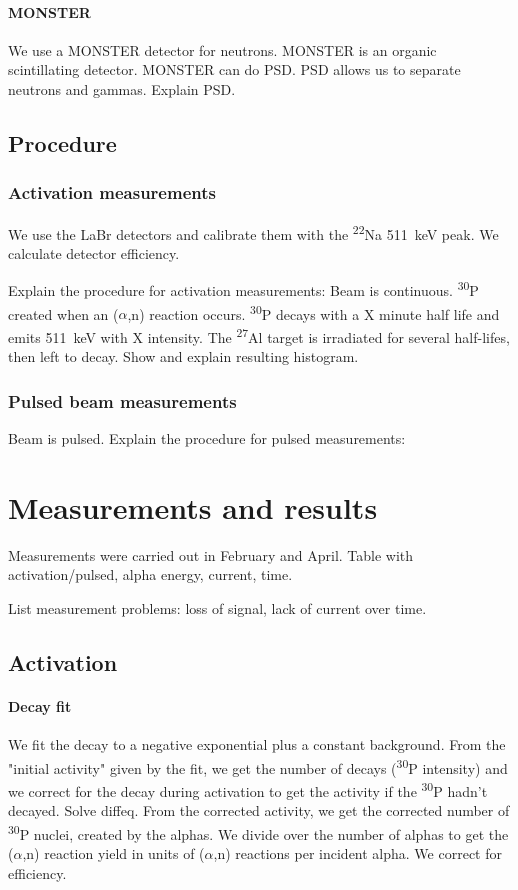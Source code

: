 \documentclass[a4paper,12pt]{report}
\newcommand{\an}{($\alpha$,n) }
\newcommand{\Aliso}{\textsuperscript{27}Al }
\newcommand{\Piso}{\textsuperscript{30}P }
\newcommand{\Na}{\textsuperscript{22}Na }
\begin{document}
\subsubsection{MONSTER}
We use a MONSTER detector for neutrons.
MONSTER is an organic scintillating detector.
MONSTER can do PSD.
PSD allows us to separate neutrons and gammas.
Explain PSD.

\section{Procedure}
\subsection{Activation measurements}
We use the LaBr detectors and calibrate them with the \Na \qty{511}{\keV} peak.
We calculate detector efficiency.

Explain the procedure for activation measurements:
Beam is continuous.
\Piso created when an \an reaction occurs.
\Piso decays with a X minute half life and emits \qty{511}{\keV} with X intensity.
The \Aliso target is irradiated for several half-lifes, then left to decay.
Show and explain resulting histogram.

\subsection{Pulsed beam measurements}
Beam is pulsed.
Explain the procedure for pulsed measurements:


\chapter{Measurements and results}
Measurements were carried out in February and April.
Table with activation/pulsed, alpha energy, current, time.

List measurement problems: loss of signal, lack of current over time.

\section{Activation}
\subsubsection{Decay fit}
We fit the decay to a negative exponential plus a constant background.
From the "initial activity" given by the fit, we get the number of decays (\Piso intensity) and we correct for the decay during activation to get the activity if the \Piso hadn't decayed. Solve diffeq.
From the corrected activity, we get the corrected number of \Piso nuclei, created by the alphas.
We divide over the number of alphas to get the \an reaction yield in units of \an reactions per incident alpha.
We correct for efficiency.
\end{document}
